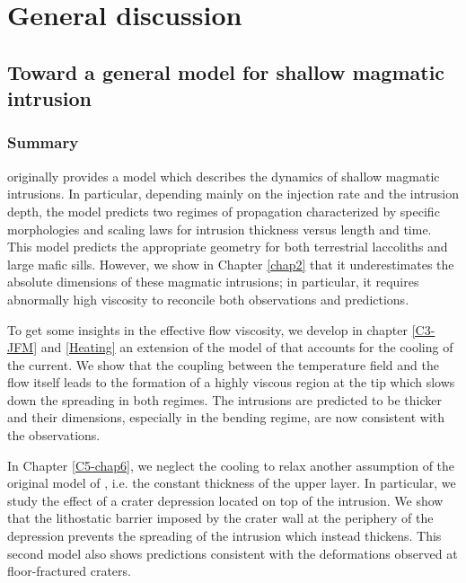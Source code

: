 \chapter{General discussion}
\label{chap9}
\minitoc

\section{Toward a general model for shallow magmatic intrusion}
\label{sec:dynam-shall-magm-1}

\subsection{Summary}
\label{sec:summary-2}

\citet{Michaut:2011kg} originally provides a model which describes the
dynamics  of shallow  magmatic intrusions.   In particular,  depending
mainly  on the  injection  rate  and the  intrusion  depth, the  model
predicts  two   regimes  of  propagation  characterized   by  specific
morphologies and  scaling laws  for intrusion thickness  versus length
and  time.  This  model  predicts the  appropriate  geometry for  both
terrestrial  laccoliths and  large mafic  sills. However,  we show  in
Chapter \ref{chap2} that it  underestimates the absolute dimensions of
these magmatic intrusions; in  particular, it requires abnormally high
viscosity to reconcile both observations and predictions.

To get  some insights in the  effective flow viscosity, we  develop in
chapter \ref{C3-JFM}  and \ref{Heating} an  extension of the  model of
\citet{Michaut:2011kg} that  accounts for the cooling  of the current.
We show that  the coupling between the temperature field  and the flow
itself leads  to the formation of  a highly viscous region  at the tip
which slows  down the  spreading in both  regimes. The  intrusions are
predicted  to  be thicker  and  their  dimensions, especially  in  the
bending regime, are now consistent with the observations.

In Chapter  \ref{C5-chap6}, we  neglect the  cooling to  relax another
assumption of  the original model of  \citet{Michaut:2011kg}, i.e. the
constant thickness  of the  upper layer. In  particular, we  study the
effect of a crater depression located on top of the intrusion.  We show that
the lithostatic barrier imposed by the crater wall at the periphery of
the depression prevents  the spreading of the  intrusion which instead
thickens. This second model also shows predictions consistent with the
deformations observed at floor-fractured craters.

